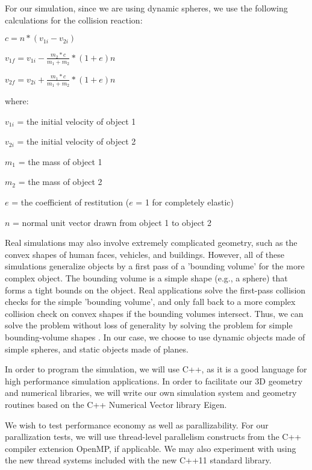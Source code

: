 \documentclass[conference]{IEEEtran}
\begin{document}
For our simulation, since we are using dynamic spheres, we use the following calculations for the collision reaction\cite{wheatchex}:

\begin{math}
c = n * (v_{1i} - v_{2i})
\end{math}

\begin{math}
v_{1f} = v_{1i} - \frac{m_2 * c}{m_1 + m_2} * (1 + e)n
\end{math}

\begin{math}
v_{2f} = v_{2i} + \frac{m_1 * c}{m_1 + m_2} * (1 + e)n
\end{math}

where:

$v_{1i}$ = the initial velocity of object 1

$v_{2i}$ = the initial velocity of object 2

$m_1$ = the mass of object 1

$m_2$ = the mass of object 2

$e$ = the coefficient of restitution ($e$ = 1 for completely elastic)

$n$ = normal unit vector drawn from object 1 to object 2


Real simulations may also involve extremely complicated geometry, such as the convex shapes of human faces, vehicles, and buildings.  However, 
all of these simulations generalize objects by a first pass of a 'bounding volume' for the more complex object.  The bounding volume is a simple shape (e.g., a sphere)
that forms a tight bounds on the object.  Real applications solve the first-pass collision checks for the simple 'bounding volume', and only fall back to a more complex
collision check on convex shapes if the bounding volumes intersect.  Thus, we can solve the problem without loss of generality by solving the problem
for simple bounding-volume shapes \cite{uberflow,cloth}.  In our case, we choose to use dynamic objects made of simple spheres, and static objects made of planes.

In order to program the simulation, we will use C++, as it is a good language for high performance simulation applications.  In order to facilitate our 
3D geometry and numerical libraries, we will write our own simulation system and geometry routines based on the C++ Numerical Vector library Eigen.  

We wish to test performance economy as well as parallizability.  For our parallization tests, we will use thread-level parallelism constructs from the C++ compiler
extension OpenMP, if applicable.  We may also experiment with using the new thread systems included with the new C++11 standard library.
\end{document}
